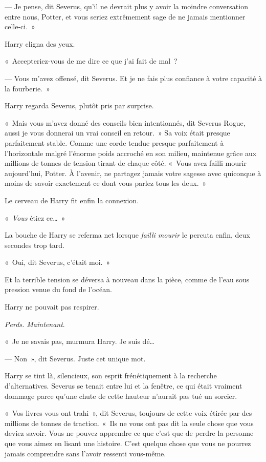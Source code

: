 --- Je pense, dit Severus, qu'il ne devrait plus y avoir la moindre conversation entre nous, Potter, et vous seriez extrêmement sage de ne jamais mentionner celle-ci.~»

Harry cligna des yeux.

«~Accepteriez-vous de me dire ce que j'ai fait de mal~?

--- Vous m'avez offensé, dit Severus. Et je ne fais plus confiance à votre capacité à la fourberie.~»

Harry regarda Severus, plutôt pris par surprise.

«~Mais vous m'avez donné des conseils bien intentionnés, dit Severus Rogue, aussi je vous donnerai un vrai conseil en retour.~» Sa voix était presque parfaitement stable. Comme une corde tendue presque parfaitement à l'horizontale malgré l'énorme poids accroché en son milieu, maintenue grâce aux millions de tonnes de tension tirant de chaque côté. «~Vous avez failli mourir aujourd'hui, Potter. À l'avenir, ne partagez jamais votre sagesse avec quiconque à moins de savoir exactement ce dont vous parlez tous les deux.~»

Le cerveau de Harry fit enfin la connexion.

«~\emph{Vous} étiez ce…~»

La bouche de Harry se referma net lorsque \emph{failli mourir} le percuta enfin, deux secondes trop tard.

«~Oui, dit Severus, c'était moi.~»

Et la terrible tension se déversa à nouveau dans la pièce, comme de l'eau sous pression venue du fond de l'océan.

Harry ne pouvait pas respirer.

\emph{Perds. Maintenant}.

«~Je ne savais pas, murmura Harry. Je suis dé…

--- Non~», dit Severus. Juste cet unique mot.

Harry se tint là, silencieux, son esprit frénétiquement à la recherche d'alternatives. Severus se tenait entre lui et la fenêtre, ce qui était vraiment dommage parce qu'une chute de cette hauteur n'aurait pas tué un sorcier.

«~Vos livres vous ont trahi~», dit Severus, toujours de cette voix étirée par des millions de tonnes de traction. «~Ils ne vous ont pas dit la seule chose que vous deviez savoir. Vous ne pouvez apprendre ce que c'est que de perdre la personne que vous aimez en lisant une histoire. C'est quelque chose que vous ne pourrez jamais comprendre sans l'avoir ressenti vous-même.

